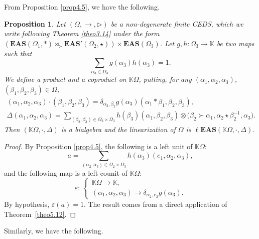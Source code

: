 \documentclass[pdftex]{sigma}
\numberwithin{equation}{section}
\newtheorem{Proposition}[Theorem]{Proposition}
 { \theoremstyle{definition}
\newtheorem{Definition}[Theorem]{Definition}
\newtheorem{Note}[Theorem]{Note}
\newtheorem{Example}[Theorem]{Example}
\newtheorem{Remark}[Theorem]{Remark}
\newtheorem{Notation}[Theorem]{Notation}}
\newcommand{\eas}{\mathbf{EAS}}
\newcommand{\leas}{\ell\mathbf{EAS}}
\begin{document}
From Proposition \ref{prop4.5}, we have the following.

\begin{Proposition}
Let $(\Omega,\rightarrow,\triangleright)$ be a non-degenerate finite CEDS, which we write following Theorem {\rm\ref{theo3.14}} under the form
$(\eas(\Omega_1,*) \rtimes_\succ \eas'(\Omega_2,\star))\times \eas(\Omega_3)$.
Let $g,h\colon\Omega_3\longrightarrow \mathbb{K}$ be two maps such that
\[\sum_{\alpha_3\in \Omega_3} g(\alpha_3)h(\alpha_3)=1.\]
We define a product and a coproduct on $\mathbb{K}\Omega$, putting, for any $(\alpha_1,\alpha_2,\alpha_3)$, $(\beta_1,\beta_2,\beta_3)\in \Omega$,
\begin{gather*}
(\alpha_1,\alpha_2,\alpha_3)\cdot(\beta_1,\beta_2,\beta_3)=\delta_{\alpha_2,\beta_2}g(\alpha_3)(\alpha_1*\beta_1,\beta_2,\beta_3),\\
\Delta(\alpha_1,\alpha_2,\alpha_3)=\sum_{(\beta_2,\beta_3)\in \Omega_2\times \Omega_3}h(\beta_3)(\alpha_1,\beta_2,\beta_3)\otimes \bigl(\beta_2\succ \alpha_1,\alpha_2\star \beta_2^{-1},\alpha_3\bigr).
\end{gather*}
Then $(\mathbb{K}\Omega,\cdot,\Delta)$ is a bialgebra and the linearization of $\Omega$ is $\leas(\mathbb{K}\Omega,\cdot,\Delta)$.
\end{Proposition}

\begin{proof}
By Proposition \ref{prop4.5}, the following is a left unit of $\mathbb{K}\Omega$:
\[a=\sum_{(\alpha_2,\alpha_3)\in \Omega_2\times \Omega_3} h(\alpha_3)(e_1,\alpha_2,\alpha_3),\]
and the following map is a left counit of $\mathbb{K}\Omega$:
\[\varepsilon\colon \ \begin{cases}
\mathbb{K}\Omega \longrightarrow \mathbb{K},\\
(\alpha_1,\alpha_2,\alpha_3) \longrightarrow \delta_{\alpha_2,e_2}g(\alpha_3).
\end{cases}\]
By hypothesis, $\varepsilon(a)=1$. The result comes from a direct application of Theorem~\ref{theo5.12}.
\end{proof}

Similarly, we have the following.
\end{document}
